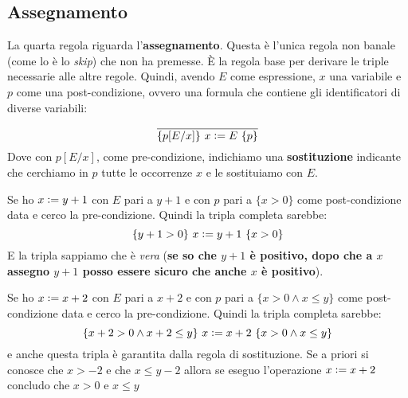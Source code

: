 \subsection{Assegnamento}
\begin{definizione}
	La quarta regola riguarda l'\textbf{assegnamento}. Questa è l'unica regola
	non banale (come lo è lo \textit{skip}) che non ha premesse. È la regola base
	per derivare le triple necessarie alle altre regole. Quindi, avendo $E$ come
	espressione, $x$ una variabile e $p$ come una post-condizione, ovvero una
	formula che contiene gli identificatori di diverse variabili:
	\begin{align}\label{AssignmentRule}
		\frac{}{\{p[E/x]\}\,\,x\cceq E\,\,\{p\}} 
	\end{align}
	Dove con $p[E/x]$, come pre-condizione, indichiamo una \textbf{sostituzione} 
	indicante che cerchiamo in $p$ tutte le occorrenze $x$ e le sostituiamo con $E$.
	\begin{esempio}
		Se ho $x \cceq y+1$ con $E$ pari a $y+1$ e con $p$ pari a $\{x>0\}$ come
		post-condizione data e cerco la pre-condizione. Quindi la tripla completa
		sarebbe: 
		\[\{y+1>0\}\,\,x \cceq y+1\,\,\{x>0\}\]
		E la tripla sappiamo che è \emph{vera} (\textbf{se so che $y+1$ è positivo, dopo
		che a $x$ assegno $y+1$ posso essere sicuro che anche $x$ è positivo}).
	\end{esempio}
	\begin{esempio}
		Se ho $x \cceq x+2$ con $E$ pari a $x+2$ e con $p$ pari a $\{x>0\land x\leq
		y\}$ come post-condizione data e cerco la pre-condizione. Quindi la tripla
		completa sarebbe:
		\[\{x+2>0\land x+2\leq y\}\,\,x \cceq x+2\,\,\{x>0\land x\leq y\}\]
		e anche questa tripla è garantita dalla regola di sostituzione.
		Se a priori si conosce che $x>-2$ e che $x \leq y-2$ allora se eseguo l'operazione $x \cceq x+2$ concludo che $x>0$ e $x \leq y$
	\end{esempio}
\end{definizione}

